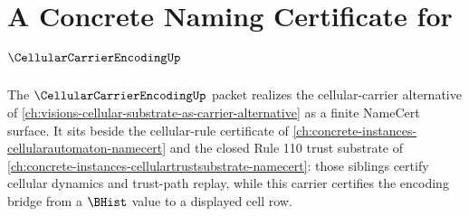 \chapter{A Concrete Naming Certificate for $\CellularCarrierEncodingUp$}
\label{ch:concrete-instances-cellularcarrierencoding-namecert}

The $\CellularCarrierEncodingUp$ packet realizes the cellular-carrier alternative of \autoref{ch:visions-cellular-substrate-as-carrier-alternative} as a finite NameCert surface. It sits beside the cellular-rule certificate of \autoref{ch:concrete-instances-cellularautomaton-namecert} and the closed Rule 110 trust substrate of \autoref{ch:concrete-instances-cellulartrustsubstrate-namecert}: those siblings certify cellular dynamics and trust-path replay, while this carrier certifies the encoding bridge from a $\BHist$ value to a displayed cell row.



